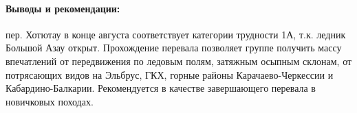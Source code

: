 \paragraph{Выводы и рекомендации:} пер. Хотютау в конце августа соответствует категории трудности 1А, т.к. ледник Большой Азау открыт. Прохождение перевала позволяет группе получить массу впечатлений от передвижения по ледовым полям, затяжным осыпным склонам, от потрясающих видов на Эльбрус, ГКХ, горные районы Карачаево-Черкессии и Кабардино-Балкарии. Рекомендуется в качестве завершающего перевала в новичковых походах.


\clearpage
